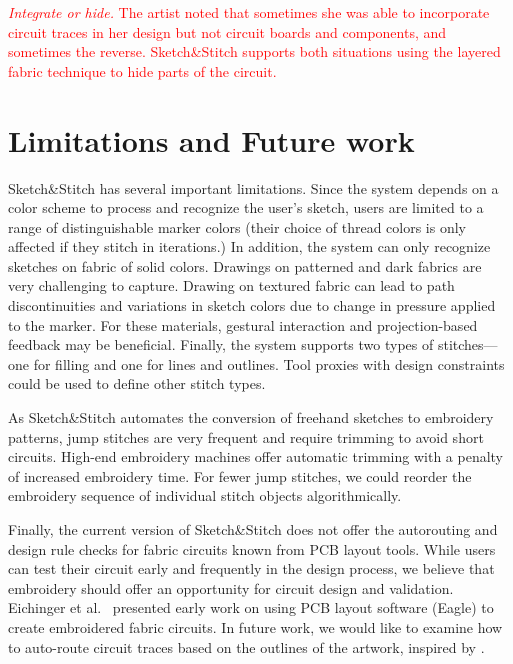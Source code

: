 \documentclass[header.tex]{subfiles}
\begin{document}
\textcolor{red}{
\textit{Integrate or hide.} The artist noted that sometimes she was able to incorporate circuit traces in her design but not circuit boards and components, and sometimes the reverse. Sketch\&Stitch supports both situations using the layered fabric technique to hide parts of the circuit.
}

\section{Limitations and Future work}

Sketch\&Stitch has several important limitations. Since the system depends on a color scheme to process and recognize the user's sketch, users are limited to a range of distinguishable marker colors (their choice of thread colors is only affected if they stitch in iterations.)
In addition, the system can only recognize sketches on fabric of solid colors. Drawings on patterned and dark fabrics are very challenging to capture.  
Drawing on textured fabric can lead to path discontinuities and variations in sketch colors due to change in pressure applied to the marker. For these materials, gestural interaction and projection-based feedback may be beneficial. Finally, the system supports two types of stitches---one for filling and one for lines and outlines. Tool proxies with design constraints \cite{mueller2012interactive} could be used to define other stitch types.


As Sketch\&Stitch automates the conversion of freehand sketches to embroidery patterns, jump stitches are very frequent and require trimming to avoid short circuits. High-end embroidery machines offer automatic trimming with a penalty of increased embroidery time. For fewer jump stitches, we could reorder the embroidery sequence of individual stitch objects algorithmically.

Finally, the current version of Sketch\&Stitch does not offer the autorouting and design rule checks for fabric circuits known from PCB layout tools. While users can test their circuit early and frequently in the design process, we believe that embroidery should offer an opportunity for circuit design and validation. Eichinger et al.\ \cite{eichinger2007using} presented early work on using PCB layout software (Eagle) to create embroidered fabric circuits. 
In future work, we would like to examine how to auto-route circuit traces based on the outlines of the artwork, inspired by \cite{savage2014series}.
\end{document}
